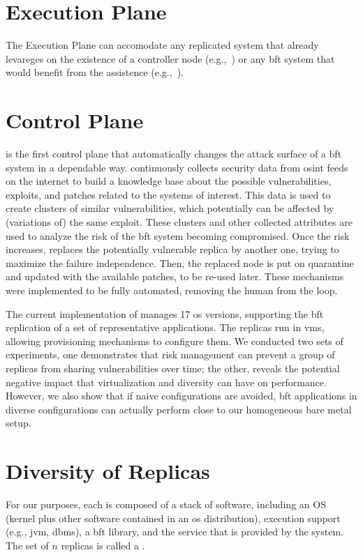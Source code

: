 \section{Execution Plane}
\label{sec:executionplane}

The Execution Plane can accomodate any replicated system that already levareges on the existence of a controller node (e.g.,~\cite{Sousa:2010,Roeder:2010,Platania:2014,Garcia:2016}) or any \gls{bft} system that would benefit from the \system assistence (e.g.,~\cite{Sousa:2018}). 


\section{Control Plane}
\label{sec:controlplane}

\system is the first control plane that automatically changes the attack surface of a \gls{bft} system in a dependable way.
\system continuously collects security data from \gls{osint} feeds on the internet to build a knowledge base about the possible vulnerabilities, exploits, and patches related to the systems of interest.
This data is used to create clusters of similar vulnerabilities, which potentially can be affected by (variations of) the same exploit.
These clusters and other collected attributes are used to analyze the risk of the \gls{bft} system becoming compromised. %
Once the risk increases, \system replaces the potentially vulnerable replica by another one, trying to maximize the failure independence. %
Then, the replaced node is put on quarantine and updated with the available patches, to be re-used later.
These mechanisms were implemented to be fully automated, removing the human from the loop.

The current implementation of \system manages 17 \gls{os} versions, supporting the \gls{bft} replication of a set of representative applications.
The replicas run in \glspl{vm}, allowing provisioning mechanisms to configure them. 
We conducted two sets of experiments, one demonstrates that \system risk management can prevent a group of replicas from sharing vulnerabilities over time; the other, reveals the potential negative impact that virtualization and diversity can have on performance. 
However, we also show that if naive configurations are avoided, \gls{bft} applications in diverse configurations can actually perform close to our homogeneous bare metal setup.

\section{Diversity of Replicas}
\label{sec:diversityofreplicas}
For our purposes, each \replica is composed of a stack of software, including an OS (kernel plus other software contained in an \gls{os} distribution), execution support (e.g., \gls{jvm}, \gls{dbms}), a \gls{bft} library, and the service that is provided by the system.
The set of $n$ replicas is called a \configuration.

